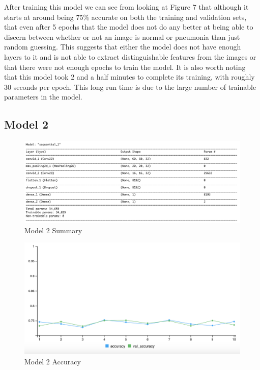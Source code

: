\documentclass[12pt]{article}
\begin{document}
After training this model we can see from looking at Figure 7 that
although it starts at around being 75\% accurate on both the training
and validation sets, that even after 5 epochs that the model does not do
any better at being able to discern between whether or not an image is
normal or pneumonia than just random guessing. This suggests that either
the model does not have enough layers to it and is not able to extract
distinguishable features from the images or that there were not enough
epochs to train the model. It is also worth noting that this model took
2 and a half minutes to complete its training, with roughly 30 seconds
per epoch. This long run time is due to the large number of trainable
parameters in the model.

\hypertarget{model-2}{%
\subsection{Model 2}\label{model-2}}

\begin{figure}

{\centering \includegraphics[width=0.75\linewidth,height=0.25\textheight]{images/model2} 

}

\caption{Model 2 Summary}\label{fig:sample-fig8}
\end{figure}

\begin{figure}

{\centering \includegraphics[width=0.75\linewidth,height=0.25\textheight]{images/model2out} 

}

\caption{Model 2 Accuracy}\label{fig:sample-fig9}
\end{figure}
\end{document}
